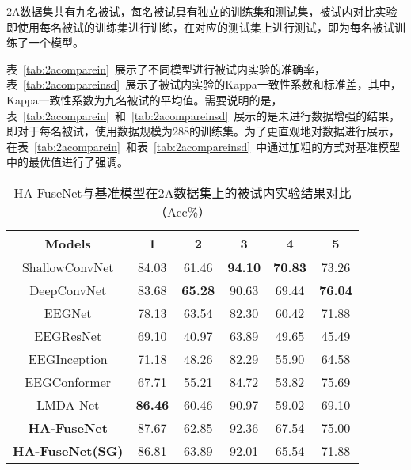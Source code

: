 2A数据集共有九名被试，每名被试具有独立的训练集和测试集，被试内对比实验即使用每名被试的训练集进行训练，在对应的测试集上进行测试，即为每名被试训练了一个模型。

表~\ref{tab:2acomparein}~展示了不同模型进行被试内实验的准确率，表~\ref{tab:2acompareinsd}~展示了被试内实验的Kappa一致性系数和标准差，其中，Kappa一致性系数为九名被试的平均值。需要说明的是，表~\ref{tab:2acomparein}~和~\ref{tab:2acompareinsd}~展示的是未进行数据增强的结果，即对于每名被试，使用数据规模为288的训练集。为了更直观地对数据进行展示，在表~\ref{tab:2acomparein}~和表~\ref{tab:2acompareinsd}~中通过加粗的方式对基准模型中的最优值进行了强调。

\begin{table}[ht]
    \centering
    \caption{HA-FuseNet与基准模型在2A数据集上的被试内实验结果对比（Acc\%）}
    \label{tab:2acomparein}
    \begin{subtable}[ht]{\textwidth}
      \centering
      \label{tab:2acompareina}
      \begin{tabularx}{\textwidth}{cCCCCC}
        \toprule
        Models & 1 & 2 & 3 & 4 & 5\\
        \midrule
        ShallowConvNet\cite{schirrmeister2017deep}  & 84.03 & 61.46 & \textbf{94.10} & \textbf{70.83} & 73.26 \\
        DeepConvNet\cite{schirrmeister2017deep} & 83.68 & \textbf{65.28} & 90.63 & 69.44 & \textbf{76.04} \\
        EEGNet\cite{lawhern2018eegnet} & 78.13 & 63.54 & 82.30 & 60.42 & 71.88 \\
        EEGResNet\cite{HBM:HBM23730} & 69.10 & 40.97 & 63.89 & 49.65 & 45.49 \\
        EEGInception\cite{zhang2021eeg} & 71.18 & 48.26 & 82.29 & 55.90 & 64.58 \\
        EEGConformer\cite{song2022eeg} & 67.71 & 55.21 & 84.72 & 53.82 & 75.69 \\
        LMDA-Net\cite{miao2023lmda} & \textbf{86.46} & 60.46 & 90.97 & 59.02 & 69.10 \\
        \midrule 
        \textbf{HA-FuseNet}  & 87.67 & 62.85 & 92.36 & 67.54 & 75.00\\
        \textbf{HA-FuseNet(SG)} & 86.81 & 63.89 & 92.01 & 65.54 & 71.88\\
        \bottomrule
      \end{tabularx}
    \end{subtable}
    \begin{subtable}[ht]{\textwidth}
      \centering

\end{subtable}
\end{table}
